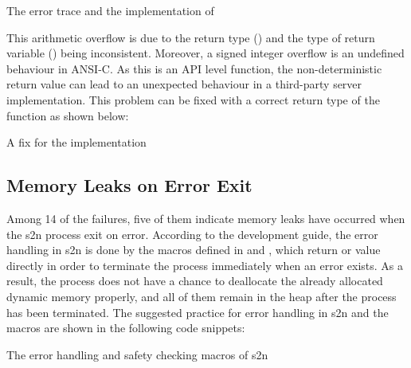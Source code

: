 \begin{listing}[H]

\caption{The error trace and the implementation of }
\end{listing}

This arithmetic overflow is due to the return type () and the type of return variable () being inconsistent. Moreover, a signed integer overflow is an undefined behaviour in ANSI-C. As this is an API level function, the non-deterministic return value can lead to an unexpected behaviour in a third-party server implementation. This problem can be fixed with a correct return type of the function as shown below:

\begin{listing}[ht]
\caption{A fix for the implementation }
\end{listing}

\subsection{Memory Leaks on Error Exit}
Among 14 of the failures, five of them indicate memory leaks have occurred when the s2n process exit on error. According to the development guide, the error handling in s2n is done by the macros defined in  and , which return  or  value directly in order to terminate the process immediately when an error exists. As a result, the process does not have a chance to deallocate the already allocated dynamic memory properly, and all of them remain in the heap after the process has been terminated. The suggested practice for error handling in s2n and the macros are shown in the following code snippets:

\begin{listing}[ht]


\caption{The error handling and safety checking macros of s2n}
\end{listing}


